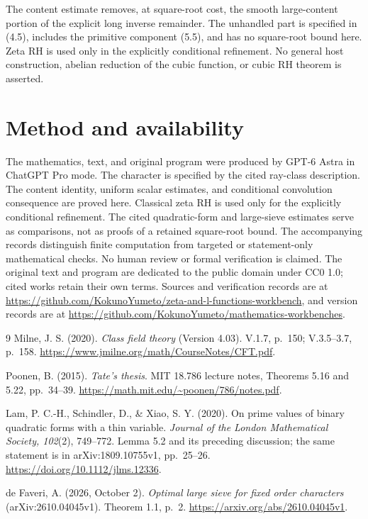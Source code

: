\documentclass[11pt]{article}
\newcommand{\workbenchurl}{https://github.com/KokunoYumeto/zeta-and-l-functions-workbench}
\newcommand{\recordurl}{https://github.com/KokunoYumeto/mathematics-workbenches}
\begin{document}
The content estimate removes, at square-root cost, the smooth
large-content portion of the explicit long inverse remainder.
The unhandled
part is specified in (4.5), includes the primitive component
(5.5), and has no square-root bound here. Zeta RH is used
only in the explicitly conditional refinement.
No general host construction, abelian reduction of the cubic
function, or cubic RH theorem is asserted.

\section*{Method and availability}
The mathematics, text, and original program were produced by GPT-6 Astra
in ChatGPT Pro mode. The character is specified by the cited ray-class
description. The content identity, uniform scalar estimates, and
conditional convolution consequence are proved here. Classical zeta RH
is used only for the explicitly conditional refinement. The cited
quadratic-form and large-sieve estimates serve as comparisons, not as
proofs of a retained square-root bound. The accompanying records distinguish
finite computation from targeted or statement-only mathematical checks.
No human review or formal verification is claimed.
The original text and program are dedicated to the public domain under
CC0 1.0; cited works retain their own terms. Sources and verification
records are at \url{\workbenchurl}, and version records are at
\url{\recordurl}.

\begin{thebibliography}{9}
\small
{}
Milne, J. S. (2020). \emph{Class field theory} (Version 4.03).
V.1.7, p.~150; V.3.5--3.7, p.~158.
\url{https://www.jmilne.org/math/CourseNotes/CFT.pdf}.

Poonen, B. (2015). \emph{Tate's thesis}.
MIT 18.786 lecture notes, Theorems 5.16 and 5.22, pp.~34--39.
\url{https://math.mit.edu/~poonen/786/notes.pdf}.

Lam, P. C.-H., Schindler, D., \& Xiao, S. Y. (2020).
On prime values of binary quadratic forms with a thin variable.
\emph{Journal of the London Mathematical Society, 102}(2),
749--772. Lemma 5.2 and its preceding discussion; the same
statement is in arXiv:1809.10755v1, pp.~25--26.
\url{https://doi.org/10.1112/jlms.12336}.

de Faveri, A. (2026, October 2).
\emph{Optimal large sieve for fixed order characters}
(arXiv:2610.04045v1). Theorem 1.1, p.~2.
\url{https://arxiv.org/abs/2610.04045v1}.
\end{thebibliography}
\end{document}
